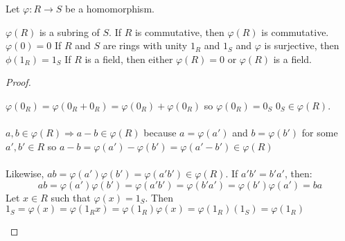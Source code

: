 \documentclass[class=scrartcl, crop=false]{standalone}
\begin{document}
\begin{proposition}
  Let $\varphi: R \to S$ be a homomorphism.
  \begin{enumerate}
    \ii
    $\varphi(R)$ is a subring of $S$.
    \ii
    If $R$ is commutative, then $\varphi(R)$ is commutative. 
    \ii
    $\varphi(0) = 0$ 
    \ii
    If $R$ and $S$ are rings with unity $1_R$ and $1_S$ and $\varphi$ is surjective, then $\phi(1_R) = 1_S$ 
    \ii
    If $R$ is a field, then either $\varphi(R) = 0$ or $\varphi(R)$ is a field.
    \begin{proof}
      \begin{itemize}
        \ii[]
        \ii[3.]
        $\varphi(0_R) = \varphi(0_R + 0_R) = \varphi(0_R) + \varphi(0_R)$ so $\varphi(0_R) = 0_S$ 
        \ii[1.]
        $0_S \in \varphi(R)$.
        \\\\
        $a, b \in \varphi(R) \Rightarrow a - b \in \varphi(R)$ because $a = \varphi(a')$ and $b = \varphi(b')$ for some $a', b' \in R$ so $a - b = \varphi(a') - \varphi(b') = \varphi(a' - b') \in \varphi(R)$
        \\\\
        Likewise,  $ab = \varphi(a')\varphi(b') = \varphi(a'b') \in \varphi(R)$.
        \ii[2.]
        If $a'b' = b'a'$, then:
        \[
          ab = \varphi(a')\varphi(b') = \varphi(a'b') = \varphi(b'a') = \varphi(b')\varphi(a') = ba
        \]
        \ii[4.]
        Let $x \in R$ such that $\varphi(x) = 1_S$. Then $1_S = \varphi(x) = \varphi(1_R x) = \varphi(1_R)\varphi(x) = \varphi(1_R)(1_S) = \varphi(1_R)$ 
      \end{itemize} 
      
    \end{proof} 
  \end{enumerate} 
\end{proposition} 
\end{document}
